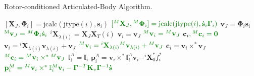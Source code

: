 \begin{algorithm}
    \caption{Rotor-conditioned Articulated-Body Algorithm.}
    \label{alg:rotaba}
    \begin{algorithmic}[1]
        \State $[\mathbf{X}_J, \boldsymbol{\Phi}_i] = \text{jcalc}(\text{jtype}(i), \dot{\mathbf{s}}_i)$
        \State $\color{webgreen}{[{} ^M\mathbf{X}_J, {} ^M\boldsymbol{\Phi}_i] = \text{jcalc}(\text{jtype}(i), \dot{\mathbf{s}}_i \boldsymbol{\Gamma} _i)}$
        \State $\mathrm{\mathbf{v}}_J = \boldsymbol{\Phi}_i \dot{\mathbf{s}}_i$
        \State $\color{webgreen}{\mathrm{{} ^M\mathbf{v}}_J = {} ^M\boldsymbol{\Phi}_i \dot{\mathbf{s}}_i}$
        \State $^i\mathbf{X}_{\lambda(i)} = \mathbf{X}_J\mathbf{X}_T (i)$
        \State $\mathrm{\mathbf{v}}_i = \mathrm{\mathbf{v}}_J$
        \State $\color{webgreen}{{}^M\mathrm{\mathbf{v}}_i = {}^M\mathrm{\mathbf{v}}_J}$
        \State $\mathbf{c}_i \color{webgreen}{,{}^M\mathbf{c}_i} = \mathbf{0}$
        \Else
        \State $\mathrm{\mathbf{v}}_i = {}^i\mathbf{X} _{\lambda(i)}\mathrm{\mathbf{v}}_{\lambda(i)} + \mathrm{\mathbf{v}}_J$
        \State $\color{webgreen}{{}^M\mathrm{\mathbf{v}}_i =  {}^i\mathbf{X} _{\lambda(i)} {}^M\mathrm{\mathbf{v}}_{\lambda(i)} + {}^M\mathrm{\mathbf{v}}_J}$
        \State $\mathbf{c}_i = \mathrm{\mathbf{v}}_i \times ^* \mathrm{\mathbf{v}}_J$
        \State $\color{webgreen}{{}^M\mathbf{c}_i = {}^M\mathrm{\mathbf{v}}_i \times ^* {}^M\mathrm{\mathbf{v}}_J}$
        \EndIf
        \State $\mathbb{I} _i ^A = \mathbb{I} _i$
        \State $\mathbf{p}_i ^A = \mathrm{\mathbf{v}}_i \times^* \mathbb{I} _i ^A \mathrm{\mathbf{v}}_i - ^i\mathbf{X} _0 ^* f ^* _i $
        \State $\color{webgreen}{\mathbf{p}_i ^M = {} ^M\mathrm{\mathbf{v}}_i \times^* \mathbb{I} _i ^M\mathrm{\mathbf{v}}_i - \boldsymbol{\Gamma} ^{-T}\mathbf{K}_v \boldsymbol{\Gamma} ^{-1} \mathbf{\dot{s}}}$
        \EndFor


\end{algorithmic}
\end{algorithm}
